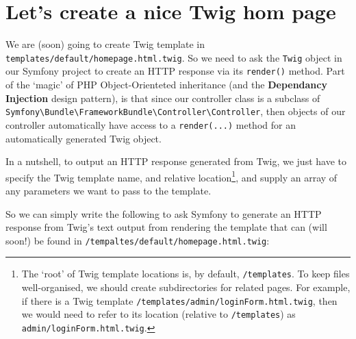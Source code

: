 \documentclass[a4paperpaper,openright]{book}
\newenvironment{Shaded}{}{}
\newcommand{\AnnotationTok}[1]{\textcolor[rgb]{0.38,0.63,0.69}{\textbf{\textit{#1}}}}
\newcommand{\CommentTok}[1]{\textcolor[rgb]{0.38,0.63,0.69}{\textit{#1}}}
\newcommand{\KeywordTok}[1]{\textcolor[rgb]{0.00,0.44,0.13}{\textbf{#1}}}
\newcommand{\NormalTok}[1]{#1}
\newcommand{\OtherTok}[1]{\textcolor[rgb]{0.00,0.44,0.13}{#1}}
\newcommand{\StringTok}[1]{\textcolor[rgb]{0.25,0.44,0.63}{#1}}
\begin{document}
\hypertarget{lets-create-a-nice-twig-hom-page}{%
\section{Let's create a nice Twig hom
page}\label{lets-create-a-nice-twig-hom-page}}

We are (soon) going to create Twig template in
\texttt{templates/default/homepage.html.twig}. So we need to ask the
\texttt{Twig} object in our Symfony project to create an HTTP response
via its \texttt{render()} method. Part of the `magic' of PHP
Object-Orienteted inheritance (and the \textbf{Dependancy Injection}
design pattern), is that since our controller class is a subclass of
\texttt{Symfony\textbackslash{}Bundle\textbackslash{}FrameworkBundle\textbackslash{}Controller\textbackslash{}Controller},
then objects of our controller automatically have access to a
\texttt{render(...)} method for an automatically generated Twig object.

In a nutshell, to output an HTTP response generated from Twig, we just
have to specify the Twig template name, and relative location\footnote{The
  `root' of Twig template locations is, by default, \texttt{/templates}.
  To keep files well-organised, we should create subdirectories for
  related pages. For example, if there is a Twig template
  \texttt{/templates/admin/loginForm.html.twig}, then we would need to
  refer to its location (relative to \texttt{/templates}) as
  \texttt{admin/loginForm.html.twig}. }, and supply an array of any
parameters we want to pass to the template.

So we can simply write the following to ask Symfony to generate an HTTP
response from Twig's text output from rendering the template that can
(will soon!) be found in \texttt{/tempaltes/default/homepage.html.twig}:

\begin{Shaded}
\end{Shaded}
\end{document}
